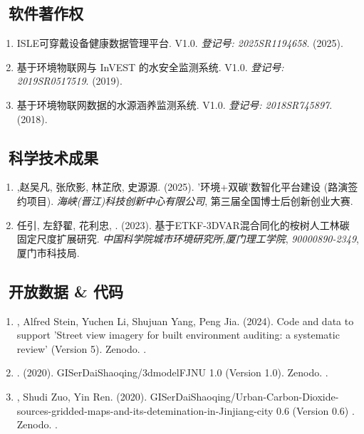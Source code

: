 \subsection*{\texorpdfstring{\faBook\ 软件著作权}{软件著作权}}
\begin{enumerate}
\item
   ISLE可穿戴设备健康数据管理平台. V1.0.
    \textit{登记号: 2025SR1194658}. (2025).
\item
   基于环境物联网与 InVEST 的水安全监测系统. V1.0.
    \textit{登记号: 2019SR0517519}. (2019).
\item
    基于环境物联网数据的水源涵养监测系统. V1.0.
    \textit{登记号: 2018SR745897}. (2018).
\end{enumerate}

\subsection*{\texorpdfstring{\faBook\ 科学技术成果}{科学技术成果}}
\begin{enumerate}
\item
    {},赵吴凡, 张欣影, 林芷欣, 史源源. (2025).
    '环境+双碳'数智化平台建设 (路演签约项目).
    \textit{海峡(晋江)科技创新中心有限公司},
    第三届全国博士后创新创业大赛.
\item
    任引, 左舒翟, 花利忠, {}. (2023).
    基于ETKF-3DVAR混合同化的桉树人工林碳固定尺度扩展研究.
    \textit{中国科学院城市环境研究所,厦门理工学院}, 
    \textit{90000890-2349}, 厦门市科技局.
\end{enumerate}

\subsection*{\texorpdfstring{\faBook\ 开放数据 \& 代码}{开放数据 \& 代码}}
\begin{enumerate}
\item
   \Shaoqing, Alfred Stein, Yuchen Li, Shujuan Yang, Peng Jia. (2024).
    Code and data to support 'Street view imagery for built environment auditing: a systematic review'  (Version 5). Zenodo. 
    .
\item
   \Shaoqing. (2020).
    GISerDaiShaoqing/3dmodelFJNU 1.0 (Version 1.0). Zenodo. 
    .
\item
   \Shaoqing, Shudi Zuo, Yin Ren. (2020).
    GISerDaiShaoqing/Urban-Carbon-Dioxide-sources-gridded-maps-and-its-detemination-in-Jinjiang-city 0.6 (Version 0.6) . Zenodo. 
    .
\end{enumerate}